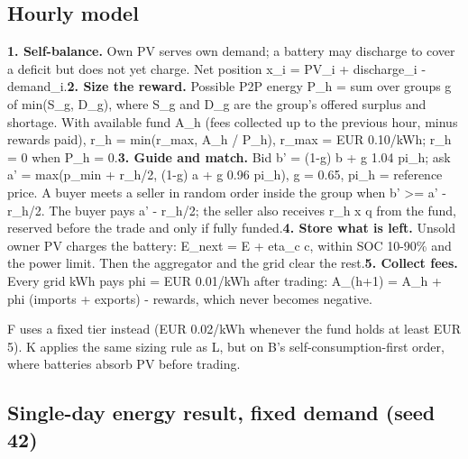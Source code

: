 \documentclass[a4paper,11pt]{article}
\begin{document}
\subsection*{Hourly model}
\par\medskip

\textbf{1. Self-balance.} Own PV serves own demand; a battery may discharge to cover a deficit but does not yet charge. Net position x\_i = PV\_i + discharge\_i - demand\_i.\newline{}\textbf{2. Size the reward.} Possible P2P energy P\_h = sum over groups g of min(S\_g, D\_g), where S\_g and D\_g are the group's offered surplus and shortage. With available fund A\_h (fees collected up to the previous hour, minus rewards paid), r\_h = min(r\_max, A\_h / P\_h), r\_max = EUR 0.10/kWh; r\_h = 0 when P\_h = 0.\newline{}\textbf{3. Guide and match.} Bid b' = (1-g) b + g 1.04 pi\_h; ask a' = max(p\_min + r\_h/2, (1-g) a + g 0.96 pi\_h), g = 0.65, pi\_h = reference price. A buyer meets a seller in random order inside the group when b' >= a' - r\_h/2. The buyer pays a' - r\_h/2; the seller also receives r\_h x q from the fund, reserved before the trade and only if fully funded.\newline{}\textbf{4. Store what is left.} Unsold owner PV charges the battery: E\_next = E + eta\_c c, within SOC 10-90\% and the power limit. Then the aggregator and the grid clear the rest.\newline{}\textbf{5. Collect fees.} Every grid kWh pays phi = EUR 0.01/kWh after trading: A\_(h+1) = A\_h + phi (imports + exports) - rewards, which never becomes negative.
\par\medskip

F uses a fixed tier instead (EUR 0.02/kWh whenever the fund holds at least EUR 5). K applies the same sizing rule as L, but on B's self-consumption-first order, where batteries absorb PV before trading.
\par\medskip

\subsection*{Single-day energy result, fixed demand (seed 42)}
\par\medskip
\end{document}
